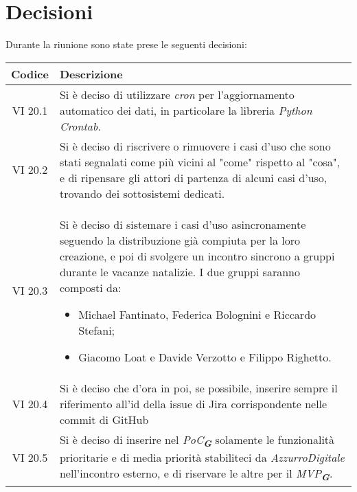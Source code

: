 
\section{Decisioni}

Durante la riunione sono state prese le seguenti decisioni:

\vspace{0.5cm}

\begin{table}[htbp]
    \centering
    \begin{tabular}{|c|p{}|}
        \hline
        \rowcolor[gray]{0.75}
        \textbf{Codice} & \textbf{Descrizione}\\
        \hline
        VI 20.1 & Si è deciso di utilizzare \emph{cron} per l'aggiornamento automatico dei dati, in particolare la libreria \emph{Python Crontab}.\\
        \hline
        VI 20.2 & Si è deciso di riscrivere o rimuovere i casi d'uso che sono stati segnalati come più vicini al "come" rispetto al "cosa", 
        e di ripensare gli attori di partenza di alcuni casi d'uso, trovando dei sottosistemi dedicati.\\
        \hline
        VI 20.3 & Si è deciso di sistemare i casi d'uso asincronamente seguendo la distribuzione già compiuta per la loro creazione, 
        e poi di svolgere un incontro sincrono a gruppi durante le vacanze natalizie.
        I due gruppi saranno composti da:
        \begin{itemize}
            \item Michael Fantinato, Federica Bolognini e Riccardo Stefani;
            \item Giacomo Loat e Davide Verzotto e Filippo Righetto.
        \end{itemize}\\
        \hline
        VI 20.4 & Si è deciso che d'ora in poi, se possibile, inserire sempre il riferimento all'id della issue di Jira corrispondente nelle commit
        di GitHub\\
        \hline
        VI 20.5 & Si è deciso di inserire nel \emph{PoC}\textsubscript{\textit{\textbf{G}}} solamente le funzionalità prioritarie e di
        media priorità stabiliteci da \emph{AzzurroDigitale} nell'incontro esterno, e di riservare le altre per il \emph{MVP}\textsubscript{\textit{\textbf{G}}}.\\

\end{tabular}
\end{table}
